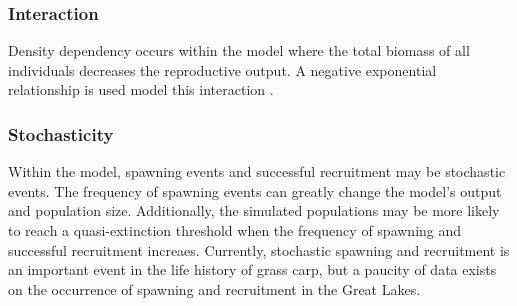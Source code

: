 \documentclass{article}[12pt]
\begin{document}

\subsubsection{Interaction}

Density dependency occurs within the model where the total biomass of all individuals decreases the reproductive output.  
A negative exponential relationship is used model this interaction \citep{bolker2008ecological}. 


\subsubsection{Stochasticity}\label{stoc}

Within the model, spawning events and successful recruitment may be stochastic events. 
The frequency of spawning events can greatly change the model's output and population size.
Additionally, the simulated populations may be more likely to reach a quasi-extinction threshold when the frequency of spawning and successful recruitment increaes.
Currently, stochastic spawning and recruitment is an important event in the life history of grass carp, but a paucity of data exists on the occurrence of spawning and recruitment in the Great Lakes. 


\end{document}
